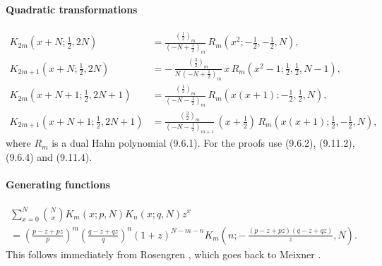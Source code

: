 \documentclass[envcountchap,graybox]{svmono}
\newcounter{rom}
\newcommand\thalf{\tfrac12}
\begin{document}
\paragraph{Quadratic transformations}
\begin{align}
K_{2m}(x+N;\thalf,2N)&=\frac{(\thalf)_m}{(-N+\thalf)_m}\,
R_m(x^2;-\thalf,-\thalf,N),
\label{31}\\
K_{2m+1}(x+N;\thalf,2N)&=-\,\frac{(\tfrac32)_m}{N\,(-N+\thalf)_m}\,
x\,R_m(x^2-1;\thalf,\thalf,N-1),
\label{33}\\
K_{2m}(x+N+1;\thalf,2N+1)&=\frac{(\tfrac12)_m}{(-N-\thalf)_m}\,
R_m(x(x+1);-\thalf,\thalf,N),
\label{32}\\
K_{2m+1}(x+N+1;\thalf,2N+1)&=\frac{(\tfrac32)_m}{(-N-\thalf)_{m+1}}\,
(x+\thalf)\,R_m(x(x+1);\thalf,-\thalf,N),
\label{34}
\end{align}
where $R_m$ is a dual Hahn polynomial (9.6.1). For the proofs use
(9.6.2), (9.11.2), (9.6.4) and (9.11.4).
%
\paragraph{Generating functions}
\begin{multline}
\sum_{x=0}^N\binom Nx K_m(x;p,N)K_n(x;q,N)z^x\\
=\left(\frac{p-z+pz}p\right)^m
\left(\frac{q-z+qz}q\right)^n
(1+z)^{N-m-n}
K_m\left(n;-\,\frac{(p-z+pz)(q-z+qz)}z,N\right).
\label{107}
\end{multline}
This follows immediately from Rosengren \cite[(3.5)]{K8}, which goes back
to Meixner \cite{K9}.
%
\end{document}
